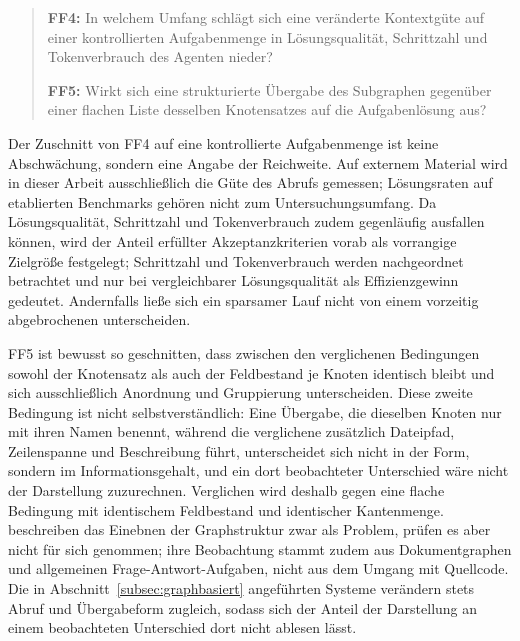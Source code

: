 \begin{quote}
\textbf{FF4:} In welchem Umfang schlägt sich eine veränderte Kontextgüte auf einer kontrollierten Aufgabenmenge in Lösungsqualität, Schrittzahl und Tokenverbrauch des Agenten nieder?

\textbf{FF5:} Wirkt sich eine strukturierte Übergabe des Subgraphen gegenüber einer flachen Liste desselben Knotensatzes auf die Aufgabenlösung aus?
\end{quote}

Der Zuschnitt von FF4 auf eine kontrollierte Aufgabenmenge ist keine Abschwächung, sondern eine Angabe der Reichweite. Auf externem Material wird in dieser Arbeit ausschließlich die Güte des Abrufs gemessen; Lösungsraten auf etablierten Benchmarks gehören nicht zum Untersuchungsumfang. Da Lösungsqualität, Schrittzahl und Tokenverbrauch zudem gegenläufig ausfallen können, wird der Anteil erfüllter Akzeptanzkriterien vorab als vorrangige Zielgröße festgelegt; Schrittzahl und Tokenverbrauch werden nachgeordnet betrachtet und nur bei vergleichbarer Lösungsqualität als Effizienzgewinn gedeutet. Andernfalls ließe sich ein sparsamer Lauf nicht von einem vorzeitig abgebrochenen unterscheiden.

FF5 ist bewusst so geschnitten, dass zwischen den verglichenen Bedingungen sowohl der Knotensatz als auch der Feldbestand je Knoten identisch bleibt und sich ausschließlich Anordnung und Gruppierung unterscheiden. Diese zweite Bedingung ist nicht selbstverständlich: Eine Übergabe, die dieselben Knoten nur mit ihren Namen benennt, während die verglichene zusätzlich Dateipfad, Zeilenspanne und Beschreibung führt, unterscheidet sich nicht in der Form, sondern im Informationsgehalt, und ein dort beobachteter Unterschied wäre nicht der Darstellung zuzurechnen. Verglichen wird deshalb gegen eine flache Bedingung mit identischem Feldbestand und identischer Kantenmenge. \textcite{pusch2026hitlkgqa} beschreiben das Einebnen der Graphstruktur zwar als Problem, prüfen es aber nicht für sich genommen; ihre Beobachtung stammt zudem aus Dokumentgraphen und allgemeinen Frage-Antwort-Aufgaben, nicht aus dem Umgang mit Quellcode. Die in Abschnitt~\ref{subsec:graphbasiert} angeführten Systeme verändern stets Abruf und Übergabeform zugleich, sodass sich der Anteil der Darstellung an einem beobachteten Unterschied dort nicht ablesen lässt.


